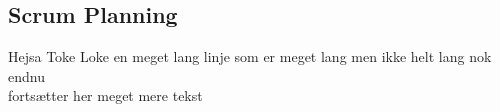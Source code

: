 \subsection{Scrum Planning}
Hejsa Toke Loke en meget lang linje som er meget lang men ikke helt lang nok endnu\\

fortsætter her meget mere tekst